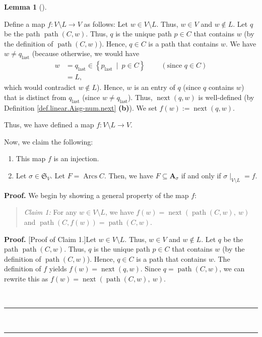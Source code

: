 \documentclass[numbers=enddot,12pt,final,onecolumn,notitlepage]{scrartcl}%
\numberwithin{exer}{section}
\theoremstyle{definition}
\newtheorem{lem}[theo]{Lemma}
\newenvironment{lemma}[1][]
{\begin{lem}[#1]\begin{leftbar}}
{\end{leftbar}\end{lem}}
\newenvironment{statement}{\begin{quote}}{\end{quote}}
\newenvironment{proof}[1][Proof]{\noindent\textbf{#1.} }{\ \rule{0.5em}{0.5em}}
\newenvironment{verlong}{}{}
\begin{document}
\begin{verlong}
\begin{lemma}
Define a map $f:V\setminus L\rightarrow V$ as follows: Let $w\in V\setminus
L$. Thus, $w\in V$ and $w\notin L$. Let $q$ be the path $\operatorname*{path}%
\left(  C,w\right)  $. Thus, $q$ is the unique path $p\in C$ that contains $w$
(by the definition of $\operatorname*{path}\left(  C,w\right)  $). Hence,
$q\in C$ is a path that contains $w$. We have $w\neq q_{\operatorname*{last}}$
(because otherwise, we would have%
\begin{align*}
w  &  =q_{\operatorname*{last}}\in\left\{  p_{\operatorname*{last}}%
\ \mid\ p\in C\right\}  \ \ \ \ \ \ \ \ \ \ \left(  \text{since }q\in C\right)
\\
&  =L,
\end{align*}
which would contradict $w\notin L$). Hence, $w$ is an entry of $q$ (since $q$
contains $w$) that is distinct from $q_{\operatorname*{last}}$ (since $w\neq
q_{\operatorname*{last}}$). Thus, $\operatorname*{next}\left(  q,w\right)  $
is well-defined (by Definition \ref{def.linear.Aisg-num.next} \textbf{(b)}).
We set $f\left(  w\right)  :=\operatorname*{next}\left(  q,w\right)  $.

Thus, we have defined a map $f:V\setminus L\rightarrow V$.

Now, we claim the following:

\begin{enumerate}
\item[\textbf{(a)}] This map $f$ is an injection.

\item[\textbf{(b)}] Let $\sigma\in\mathfrak{S}_{V}$. Let
$F=\operatorname*{Arcs}C$. Then, we have $F\subseteq\mathbf{A}_{\sigma}$ if
and only if $\left.  \sigma\mid_{V\setminus L}\right.  =f$.
\end{enumerate}
\end{lemma}

\begin{proof}
We begin by showing a general property of the map $f$:

\begin{statement}
\textit{Claim 1:} For any $w\in V\setminus L$, we have $f\left(  w\right)
=\operatorname*{next}\left(  \operatorname*{path}\left(  C,w\right)
,\ w\right)  $ and $\operatorname*{path}\left(  C,f\left(  w\right)  \right)
=\operatorname*{path}\left(  C,w\right)  $.
\end{statement}

\begin{proof}
[Proof of Claim 1.]Let $w\in V\setminus L$. Thus, $w\in V$ and $w\notin L$.
Let $q$ be the path $\operatorname*{path}\left(  C,w\right)  $. Thus, $q$ is
the unique path $p\in C$ that contains $w$ (by the definition of
$\operatorname*{path}\left(  C,w\right)  $). Hence, $q\in C$ is a path that
contains $w$. The definition of $f$ yields $f\left(  w\right)
=\operatorname*{next}\left(  q,w\right)  $. Since $q=\operatorname*{path}%
\left(  C,w\right)  $, we can rewrite this as $f\left(  w\right)
=\operatorname*{next}\left(  \operatorname*{path}\left(  C,w\right)
,\ w\right)  $.


\end{proof}
\end{proof}
\end{verlong}
\end{document}
